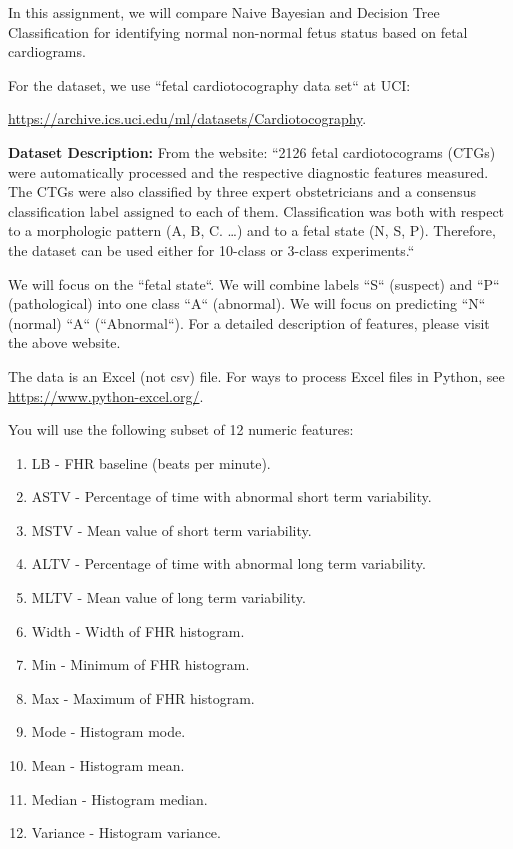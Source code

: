 \documentclass[../../main.tex]{subfiles}
\begin{document}
    In this assignment, we will compare Naive Bayesian and Decision Tree Classification for identifying normal \versus{} non-normal fetus status based on fetal cardiograms.

    For the dataset, we use ``fetal cardiotocography data set`` at UCI: \par
    \url{https://archive.ics.uci.edu/ml/datasets/Cardiotocography}.

    \textbf{Dataset Description: } From the website: ``2126 fetal cardiotocograms (CTGs) were automatically processed and the respective diagnostic features measured.
    The CTGs were also classified by three expert obstetricians and a consensus classification label assigned to each of them.
    Classification was both with respect to a morphologic pattern (A, B, C. \dots) and to a fetal state (N, S, P).
    Therefore, the dataset can be used either for 10-class or 3-class experiments.``

    We will focus on the ``fetal state``.
    We will combine labels ``S`` (suspect) and ``P`` (pathological) into one class ``A`` (abnormal).
    We will focus on predicting ``N`` (normal) \versus{} ``A`` (``Abnormal``).
    For a detailed description of features, please visit the above website.

    The data is an Excel (not csv) file.
    For ways to process Excel files in Python, see \url{https://www.python-excel.org/}.

    You will use the following subset of 12 numeric features:

    \begin{enumerate}
        \item LB - FHR baseline (beats per minute).
        \item ASTV - Percentage of time with abnormal short term variability.
        \item MSTV - Mean value of short term variability.
        \item ALTV - Percentage of time with abnormal long term variability.
        \item MLTV - Mean value of long term variability.
        \item Width - Width of FHR histogram.
        \item Min - Minimum of FHR histogram.
        \item Max - Maximum of FHR histogram.
        \item Mode - Histogram mode.
        \item Mean - Histogram mean.
        \item Median - Histogram median.
        \item Variance - Histogram variance.
    \end{enumerate}
\end{document}
